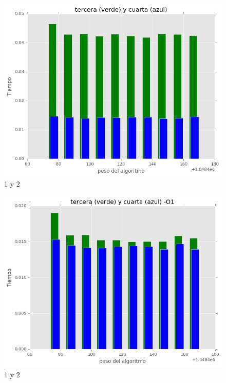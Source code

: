 \documentclass[a4paper, 11pt]{article}
\begin{document}
\begin{figure}[!hbp]
	\includegraphics[scale=0.6]{3y4p.png}
	\caption{1 y 2	\label{3y4p}}
\end{figure} 
\begin{figure}[!hbp]
	\includegraphics[scale=0.6]{3y4p_1.png}
	\caption{1 y 2	\label{3y4p_1p}}
\end{figure} 
\end{document}
